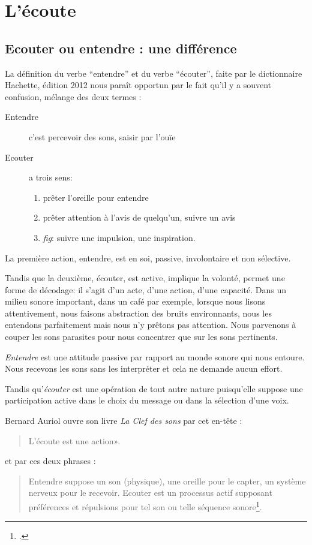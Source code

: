 \chapter{L'écoute}

\section{Ecouter ou entendre : une différence}

La définition du verbe ``entendre'' et du verbe ``écouter'', faite par
le dictionnaire Hachette, édition 2012 nous paraît opportun par le %
fait qu'il y a souvent confusion, mélange des deux termes :
\begin{description}
\item[Entendre] c'est  percevoir des sons, saisir par l'ouïe
\item[Ecouter] a trois sens: 
\begin{enumerate}
	\item prêter l'oreille pour entendre
	\item prêter attention
	à l'avis de quelqu'un, suivre un avis
	\item \emph{fig}: suivre une impulsion,
	une inspiration.
\end{enumerate}
\end{description}

La première action, entendre, est en soi, passive, involontaire et non
sélective.

Tandis que la deuxième, écouter, est active, implique la volonté,
permet une forme de décodage: il s'agit d'un acte, d'une action,
d'une capacité. Dans un milieu sonore important, dans un café par
exemple, lorsque nous lisons attentivement, nous faisons abstraction
des bruits environnants, nous les entendons parfaitement mais nous n'y
prêtons pas attention. Nous parvenons à couper les sons parasites pour
nous concentrer que sur les sons pertinents.

\emph{Entendre} est une attitude passive par rapport au monde sonore
qui nous entoure. Nous recevons les sons sans les interpréter et cela
ne demande aucun effort.

Tandis qu'\emph{écouter} est une opération de tout autre nature
puisqu'elle suppose une participation active dans le choix du message
ou dans la sélection d'une voix.

Bernard Auriol ouvre son livre \emph{La Clef
des sons} par cet en-tête :
\begin{quote}
\og L'écoute est une action». %
\end{quote} %
et par ces deux phrases :
\begin{quotation} %
  Entendre suppose un son (physique), une oreille
pour le capter, un système nerveux pour le recevoir. Ecouter est un
processus actif supposant préférences et répulsions pour tel son ou
telle séquence sonore\footnote{\cite{Auri96:clesons}.}.
\end{quotation}
 
